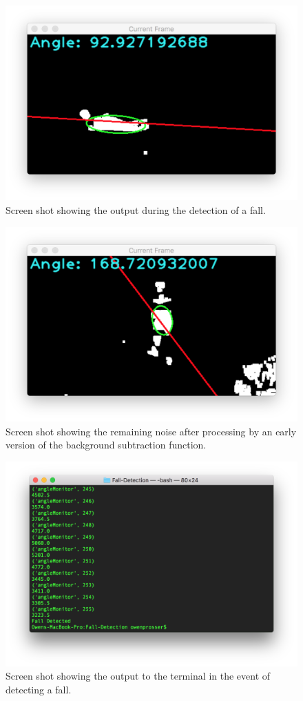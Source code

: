 \documentclass[11pt,a4paper]{report}
\begin{document}
\begin{figure}[H]
 \centering
 \includegraphics[scale = 0.6]{fallDetected.png}
 \caption{Screen shot showing the output during the detection of a fall.}
 \label{fig:fallDetected}
\end{figure}

\begin{figure}[H]
 \centering
 \includegraphics[scale = 0.6]{bgSubNoise.png}
 \caption{Screen shot showing the remaining noise after processing by an early version of the background subtraction function.}
 \label{fig:bgSubNoise}
\end{figure}

\begin{figure}[H]
 \centering
 \includegraphics[scale = 0.5]{fallDetectedOutput.png}
 \caption{Screen shot showing the output to the terminal in the event of detecting a fall.}
 \label{fig:fallDetectedOutput}
\end{figure}
\end{document}
